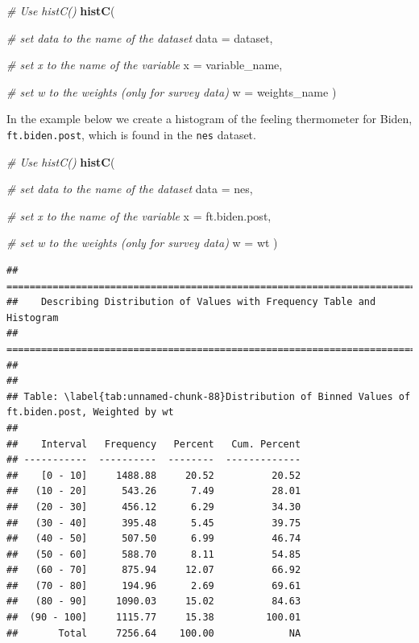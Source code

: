 \documentclass[
]{book}
\newenvironment{Shaded}{\begin{snugshade}}{\end{snugshade}}
\newcommand{\AttributeTok}[1]{\textcolor[rgb]{0.13,0.29,0.53}{#1}}
\newcommand{\CommentTok}[1]{\textcolor[rgb]{0.56,0.35,0.01}{\textit{#1}}}
\newcommand{\FunctionTok}[1]{\textcolor[rgb]{0.13,0.29,0.53}{\textbf{#1}}}
\newcommand{\NormalTok}[1]{#1}
\begin{document}
\begin{Shaded}
\begin{Highlighting}[]
\CommentTok{\# Use \textasciigrave{}histC()\textasciigrave{}}
\FunctionTok{histC}\NormalTok{(}
  
  \CommentTok{\# set data to the name of the dataset}
  \AttributeTok{data =}\NormalTok{ dataset,}
  
  \CommentTok{\# set x to the name of the variable}
  \AttributeTok{x =}\NormalTok{ variable\_name,}
  
  \CommentTok{\# set w to the weights (only for survey data)}
  \AttributeTok{w =}\NormalTok{ weights\_name}
\NormalTok{)}
\end{Highlighting}
\end{Shaded}

In the example below we create a histogram of the feeling thermometer for Biden, \texttt{ft.biden.post}, which is found in the \texttt{nes} dataset.

\begin{Shaded}
\begin{Highlighting}[]
\CommentTok{\# Use \textasciigrave{}histC()\textasciigrave{}}
\FunctionTok{histC}\NormalTok{(}
  
  \CommentTok{\# set data to the name of the dataset}
  \AttributeTok{data =}\NormalTok{ nes,}
  
  \CommentTok{\# set x to the name of the variable}
  \AttributeTok{x =}\NormalTok{ ft.biden.post,}
  
  \CommentTok{\# set w to the weights (only for survey data)}
  \AttributeTok{w =}\NormalTok{ wt}
\NormalTok{)}
\end{Highlighting}
\end{Shaded}

\begin{verbatim}
## ===========================================================================
##    Describing Distribution of Values with Frequency Table and Histogram
## ===========================================================================
## 
## 
## Table: \label{tab:unnamed-chunk-88}Distribution of Binned Values of ft.biden.post, Weighted by wt
## 
##    Interval   Frequency   Percent   Cum. Percent
## -----------  ----------  --------  -------------
##    [0 - 10]     1488.88     20.52          20.52
##   (10 - 20]      543.26      7.49          28.01
##   (20 - 30]      456.12      6.29          34.30
##   (30 - 40]      395.48      5.45          39.75
##   (40 - 50]      507.50      6.99          46.74
##   (50 - 60]      588.70      8.11          54.85
##   (60 - 70]      875.94     12.07          66.92
##   (70 - 80]      194.96      2.69          69.61
##   (80 - 90]     1090.03     15.02          84.63
##  (90 - 100]     1115.77     15.38         100.01
##       Total     7256.64    100.00             NA
\end{verbatim}
\end{document}
